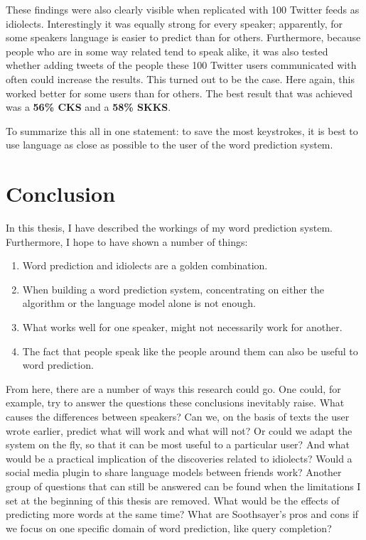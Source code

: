 \documentclass[12pt]{article}
\let\stdsection\section
\renewcommand\section{\newpage\stdsection}
\begin{document}
These findings were also clearly visible when replicated with 100 Twitter feeds as idiolects. Interestingly it was equally strong for every speaker; apparently, for some speakers language is easier to predict than for others. Furthermore, because people who are in some way related tend to speak alike, it was also tested whether adding tweets of the people these 100 Twitter users communicated with often could increase the results. This turned out to be the case. Here again, this worked better for some users than for others. The best result that was achieved was a \textbf{56\% CKS} and a \textbf{58\% SKKS}.

To summarize this all in one statement: to save the most keystrokes, it is best to use language as close as possible to the user of the word prediction system.

\section{Conclusion} \label{conclusion}
In this thesis, I have described the workings of my word prediction system. Furthermore, I hope to have shown a number of things:

\begin{enumerate}
\item Word prediction and idiolects are a golden combination.
\item When building a word prediction system, concentrating on either the algorithm or the language model alone is not enough.
\item What works well for one speaker, might not necessarily work for another.
\item The fact that people speak like the people around them can also be useful to word prediction.
\end{enumerate}

From here, there are a number of ways this research could go. One could, for example, try to answer the questions these conclusions inevitably raise. What causes the differences between speakers? Can we, on the basis of texts the user wrote earlier, predict what will work and what will not? Or could we adapt the system on the fly, so that it can be most useful to a particular user? And what would be a practical implication of the discoveries related to idiolects? Would a social media plugin to share language models between friends work? Another group of questions that can still be answered can be found when the limitations I set at the beginning of this thesis are removed. What would be the effects of predicting more words at the same time? What are Soothsayer's pros and cons if we focus on one specific domain of word prediction, like query completion?
\end{document}
